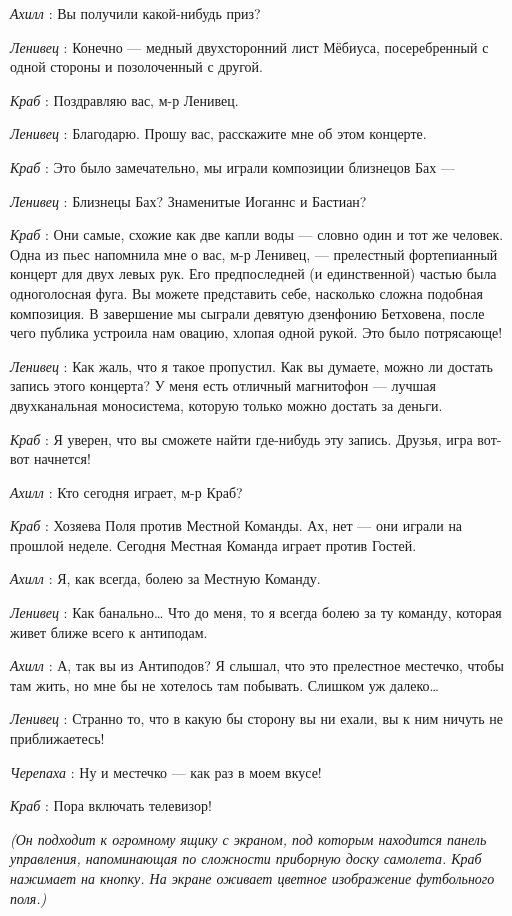 \documentclass[../main.tex]{subfiles}
\begin{document}
\begin{dialogue}
\emph{Ахилл} : Вы получили какой-нибудь приз?

\emph{Ленивец} : Конечно --- медный двухсторонний лист Мёбиуса, посеребренный с одной стороны и позолоченный с другой.

\emph{Краб} : Поздравляю вас, м-р Ленивец.

\emph{Ленивец} : Благодарю. Прошу вас, расскажите мне об этом концерте.

\emph{Краб} : Это было замечательно, мы играли композиции близнецов Бах ---

\emph{Ленивец} : Близнецы Бах? Знаменитые Иоганнс и Бастиан?

\emph{Краб} : Они самые, схожие как две капли воды --- словно один и тот же человек. Одна из пьес напомнила мне о вас, м-р Ленивец, --- прелестный фортепианный концерт для двух левых рук. Его предпоследней (и единственной) частью была одноголосная фуга. Вы можете представить себе, насколько сложна подобная композиция. В завершение мы сыграли девятую дзенфонию Бетховена, после чего публика устроила нам овацию, хлопая одной рукой. Это было потрясающе!

\emph{Ленивец} : Как жаль, что я такое пропустил. Как вы думаете, можно ли достать запись этого концерта? У меня есть отличный магнитофон --- лучшая двухканальная моносистема, которую только можно достать за деньги.

\emph{Краб} : Я уверен, что вы сможете найти где-нибудь эту запись. Друзья, игра вот-вот начнется!

\emph{Ахилл} : Кто сегодня играет, м-р Краб?

\emph{Краб} : Хозяева Поля против Местной Команды. Ах, нет --- они играли на прошлой неделе. Сегодня Местная Команда играет против Гостей.

\emph{Ахилл} : Я, как всегда, болею за Местную Команду.

\emph{Ленивец} : Как банально\ldots{} Что до меня, то я всегда болею за ту команду, которая живет ближе всего к антиподам.

\emph{Ахилл} : А, так вы из Антиподов? Я слышал, что это прелестное местечко, чтобы там жить, но мне бы не хотелось там побывать. Слишком уж далеко\ldots{}

\emph{Ленивец} : Странно то, что в какую бы сторону вы ни ехали, вы к ним ничуть не приближаетесь!

\emph{Черепаха} : Ну и местечко --- как раз в моем вкусе!

\emph{Краб} : Пора включать телевизор!

\emph{(Он подходит к огромному ящику с экраном, под которым находится панель управления, напоминающая по сложности приборную доску самолета. Краб нажимает на кнопку. На экране оживает цветное изображение футбольного поля.)}


\end{dialogue}
\end{document}
